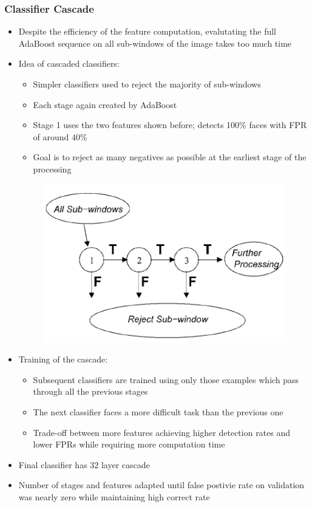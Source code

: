 \subsubsection*{Classifier Cascade}
\begin{itemize}
    \item
        Despite the efficiency of the feature computation, evalutating the full AdaBoost sequence on all sub-windows of the image takes too much time
    \item
        Idea of cascaded classifiers:
        \begin{itemize}
            \item
                Simpler classifiers used to reject the majority of sub-windows
            \item
                Each stage again created by AdaBoost
            \item
                Stage 1 uses the two features shown before; detects 100\% faces with FPR of around $40$\%
            \item
                Goal is to reject as many negatives as possible at the earliest stage of the processing
        \end{itemize}
        \begin{figure}[H]
            \centering
            \includegraphics[scale=0.8]{figures/viola3}
        \end{figure}
    \item
        Training of the cascade:
        \begin{itemize}
            \item
                Subsequent classifiers are trained using only those examples which pass through all the previous stages
            \item
                The next classifier faces a more difficult task than the previous one
            \item
                Trade-off between more features achieving higher detection rates and lower FPRs while requiring more computation time
        \end{itemize}
    \item
        Final classifier has 32 layer cascade
    \item
        Number of stages and features adapted until false postivie rate on validation was nearly zero while maintaining high correct rate
\end{itemize}
